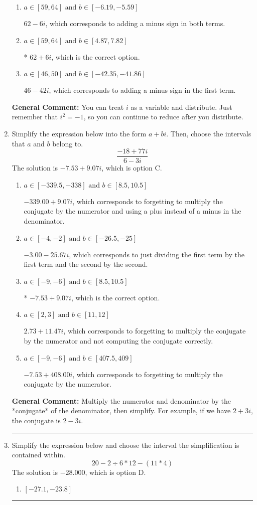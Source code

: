 \documentclass{extbook}[14pt]
\newcommand{\litem}[1]{\item #1

\rule{\textwidth}{0.4pt}}
\begin{document}
\begin{enumerate}
{\begin{enumerate}[label=\Alph*.]
 $46 + 42 i$, which corresponds to adding a minus sign in the second term.
\item \( a \in [59, 64] \text{ and } b \in [-6.19, -5.59] \)

 $62 - 6 i$, which corresponds to adding a minus sign in both terms.
\item \( a \in [59, 64] \text{ and } b \in [4.87, 7.82] \)

* $62 + 6 i$, which is the correct option.
\item \( a \in [46, 50] \text{ and } b \in [-42.35, -41.86] \)

 $46 - 42 i$, which corresponds to adding a minus sign in the first term.
\end{enumerate}

\textbf{General Comment:} You can treat $i$ as a variable and distribute. Just remember that $i^2=-1$, so you can continue to reduce after you distribute.
}
\litem{
Simplify the expression below into the form $a+bi$. Then, choose the intervals that $a$ and $b$ belong to.
\[ \frac{-18 + 77 i}{6 - 3 i} \]The solution is \( -7.53  + 9.07 i \), which is option C.\begin{enumerate}[label=\Alph*.]
\item \( a \in [-339.5, -338] \text{ and } b \in [8.5, 10.5] \)

 $-339.00  + 9.07 i$, which corresponds to forgetting to multiply the conjugate by the numerator and using a plus instead of a minus in the denominator.
\item \( a \in [-4, -2] \text{ and } b \in [-26.5, -25] \)

 $-3.00  - 25.67 i$, which corresponds to just dividing the first term by the first term and the second by the second.
\item \( a \in [-9, -6] \text{ and } b \in [8.5, 10.5] \)

* $-7.53  + 9.07 i$, which is the correct option.
\item \( a \in [2, 3] \text{ and } b \in [11, 12] \)

 $2.73  + 11.47 i$, which corresponds to forgetting to multiply the conjugate by the numerator and not computing the conjugate correctly.
\item \( a \in [-9, -6] \text{ and } b \in [407.5, 409] \)

 $-7.53  + 408.00 i$, which corresponds to forgetting to multiply the conjugate by the numerator.
\end{enumerate}

\textbf{General Comment:} Multiply the numerator and denominator by the *conjugate* of the denominator, then simplify. For example, if we have $2+3i$, the conjugate is $2-3i$.
}
\litem{
Simplify the expression below and choose the interval the simplification is contained within.
\[ 20 - 2 \div 6 * 12 - (11 * 4) \]The solution is \( -28.000 \), which is option D.\begin{enumerate}[label=\Alph*.]
\item \( [-27.1, -23.8] \)


\end{enumerate}}
\end{enumerate}
\end{document}
